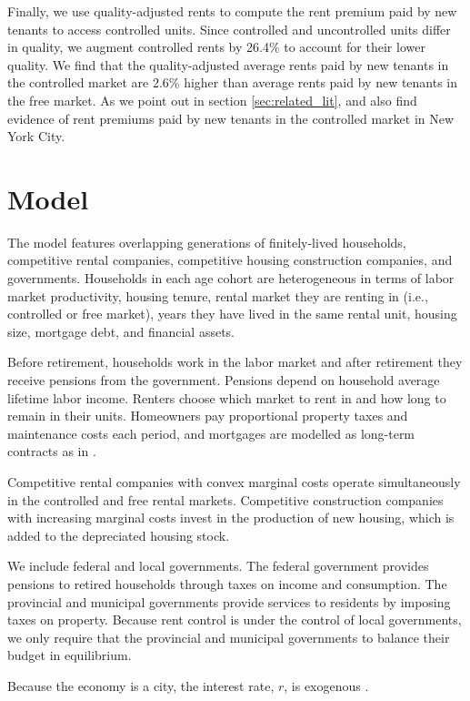 \documentclass[parskip=full]{article}
\begin{document}
Finally, we use quality-adjusted rents to compute the rent premium paid by new tenants to access controlled units. Since controlled and uncontrolled units differ in quality, we augment controlled rents by 26.4\% to account for their lower quality. We find that the quality-adjusted average rents paid by new tenants in the controlled market are 2.6\% higher than average rents paid by new tenants in the free market. As we point out in section \ref{sec:related_lit}, \citet{early-2000} and \citet{cjq-2023} also find evidence of rent premiums paid by new tenants in the controlled market in New York City.

\section{Model}\label{sec:model}

The model features overlapping generations of finitely-lived households, competitive rental companies, competitive housing construction companies, and governments. Households in each age cohort are heterogeneous in terms of labor market productivity, housing tenure, rental market they are renting in (i.e., controlled or free market), years they have lived in the same rental unit, housing size, mortgage debt, and financial assets. 

Before retirement, households work in the labor market and after retirement they receive pensions from the government. Pensions depend on household average lifetime labor income. Renters choose which market to rent in and how long to remain in their units. Homeowners pay proportional property taxes and maintenance costs each period, and mortgages are modelled as long-term contracts as in \citet{rs-2023}. 

Competitive rental companies with convex marginal costs operate simultaneously in the controlled and free rental markets. Competitive construction companies with increasing marginal costs invest in the production of new housing, which is added to the depreciated housing stock. 

We include federal and local governments. The federal government provides pensions to retired households through taxes on income and consumption. The provincial and municipal governments provide services to residents by imposing taxes on property. Because rent control is under the control of local governments, we only require that the provincial and municipal governments to balance their budget in equilibrium. 

Because the economy is a city, the interest rate, $r$, is exogenous \citep{sommeretal-2013,arslanetal-2015,sommersullivan-2017,kaplanetal-2019}. 
\end{document}
